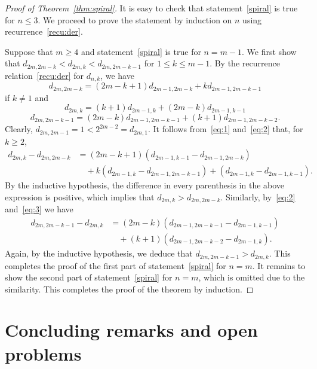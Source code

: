 \documentclass[12pt]{amsart}
\numberwithin{equation}{section}
\theoremstyle{plain}
\theoremstyle{definition}
\begin{document}
 \begin{proof}[Proof of Theorem~\ref{thm:spiral}]
  It is easy to check that statement~\eqref{spiral} is true for $n\leq 3$. We proceed to prove the statement by induction on $n$ using recurrence~\eqref{recu:der}.
 
 Suppose that $m\geq4$ and statement~\eqref{spiral} is true for $n=m-1$. We first show that $d_{2m,2m-k}<d_{2m,k}< d_{2m,2m-k-1}$ for $1\leq k\leq m-1$. By the recurrence relation~\eqref{recu:der} for $d_{n,k}$, we have
 \begin{equation}\label{eq:1}
 d_{2m,2m-k}=(2m-k+1)d_{2m-1,2m-k}+kd_{2m-1,2m-k-1}
 \end{equation}
 if $k\neq1$ and
  \begin{equation}\label{eq:2}
 d_{2m,k}=(k+1)d_{2m-1,k}+(2m-k)d_{2m-1,k-1}
 \end{equation}
  \begin{equation}\label{eq:3}
 d_{2m,2m-k-1}=(2m-k)d_{2m-1,2m-k-1}+(k+1)d_{2m-1,2m-k-2}.
 \end{equation}
 Clearly, $d_{2m,2m-1}=1<2^{2m-2}=d_{2m,1}$. It follows from~\eqref{eq:1} and~\eqref{eq:2} that, for $k\geq2$, 
 \begin{align*}
 d_{2m,k}-d_{2m,2m-k}&=(2m-k+1)(d_{2m-1,k-1}-d_{2m-1,2m-k})\\
 &\quad+k(d_{2m-1,k}-d_{2m-1,2m-k-1})+(d_{2m-1,k}-d_{2m-1,k-1}).
 \end{align*}
 By the inductive hypothesis, the difference in every parenthesis in the above expression is positive, which implies that $d_{2m,k}>d_{2m,2m-k}$. Similarly, by~\eqref{eq:2} and~\eqref{eq:3} we have
 \begin{align*}
 d_{2m,2m-k-1}-d_{2m,k}&=(2m-k)(d_{2m-1,2m-k-1}-d_{2m-1,k-1})\\
 &\quad+(k+1)(d_{2m-1,2m-k-2}-d_{2m-1,k}).
 \end{align*}
 Again, by the inductive hypothesis, we deduce that $d_{2m,2m-k-1}>d_{2m,k}$. This completes the proof of the first part of statement~\eqref{spiral} for $n=m$. 
 It remains to show the second part of statement~\eqref{spiral} for $n=m$, which is omitted due to the  similarity. This completes the proof of the theorem by induction. 
 \end{proof}
 
 
 
 

\section{Concluding remarks and open problems}\label{sec:gessel}
\end{document}

